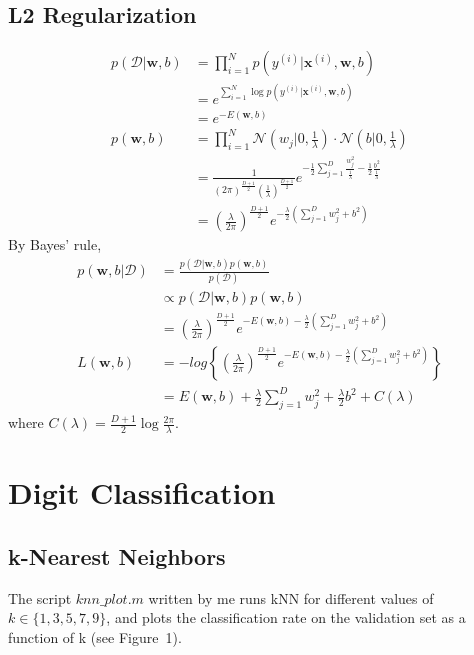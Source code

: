 \documentclass{article}
\newcommand \w{\mathbf{w}}
\newcommand \xxi{\mathbf{x}^{(i)}}
\newcommand \yi{y^{(i)}}
\newcommand \sumi {\sum_{i=1}^}
\begin{document}
\subsection{L2 Regularization}
\begin{align*}
p(\mathcal{D} | \w, b) &= \prod_{i=1}^N p\left( \yi | \xxi, \w, b \right) \\
&= e^{\sumi{N} \log p\left( \yi | \xxi, \w, b \right)} \\
&= e^{-E(\w, b)} \\
p(\w, b) &= \prod_{i=1}^N \mathcal{N} \left( w_j | 0, \frac{1}{\lambda} \right) \cdot \mathcal{N} \left( b | 0, \frac{1}{\lambda} \right) \\
&= \frac{1}{(2\pi)^\frac{D+1}{2} \left( \frac{1}{\lambda} \right)^\frac{D+1}{2}}
e^{-\frac{1}{2} \sum_{j=1}^D \frac{w_j^2}{\frac{1}{\lambda}} - \frac{1}{2} \frac{b^2}{\frac{1}{\lambda}}} \\
&= \left( \frac{\lambda}{2\pi} \right)^\frac{D+1}{2} e^{-\frac{\lambda}{2} \left( \sum_{j=1}^D w_j^2 + b^2 \right)}
\end{align*}
By Bayes' rule,
\begin{align*}
p(\w, b | \mathcal{D}) &= \frac{p(\mathcal{D} | \w, b) p(\w,b)}{p(\mathcal{D})} \\
&\propto p(\mathcal{D} | \w, b) p(\w, b) \\
&=\left( \frac{\lambda}{2\pi} \right)^\frac{D+1}{2} e^{-E(\w, b)-\frac{\lambda}{2} \left( \sum_{j=1}^D w_j^2 + b^2 \right)} \\
L(\w, b) &= -log \left\{ \left( \frac{\lambda}{2\pi} \right)^\frac{D+1}{2}
e^{-E(\w, b)-\frac{\lambda}{2} \left( \sum_{j=1}^D w_j^2 + b^2 \right)} \right\} \\
&= E(\w, b) + \frac{\lambda}{2} \sum_{j=1}^D w_j^2 + \frac{\lambda}{2} b^2 + C(\lambda)
\end{align*}
where $C(\lambda) = \frac{D+1}{2} \log \frac{2\pi}{\lambda}$.


\section{Digit Classification}
\subsection{k-Nearest Neighbors}
The script $knn\_plot.m$ written by me runs kNN for different values of $k \in \{1, 3, 5, 7, 9\}$, and plots the classification rate on the validation set as a function of k (see Figure~1).
\end{document}
